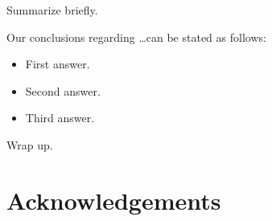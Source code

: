 \documentclass[useAMS,usenatbib]{mn2e}
\begin{document}
Summarize briefly.

Our conclusions regarding \ldots can be stated as follows:

\begin{itemize}

\item First answer.

\item Second answer. 

\item Third answer. 

\end{itemize}

Wrap up.



\section*{Acknowledgements}






\label{lastpage}
\bsp
\end{document}
